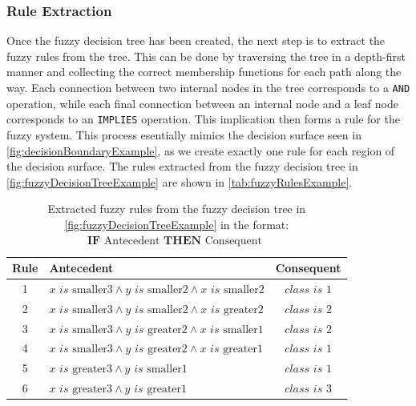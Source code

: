 \subsubsection{Rule Extraction}

Once the fuzzy decision tree has been created, the next step is to extract the fuzzy rules from the tree. This can be done by traversing the tree in a depth-first manner and collecting the correct membership functions for each path along the way. Each connection between two internal nodes in the tree corresponds to a \texttt{AND} operation, while each final connection between an internal node and a leaf node corresponds to an \texttt{IMPLIES} operation. This implication then forms a rule for the fuzzy system.
This process esentially mimics the decision surface seen in \autoref{fig:decisionBoundaryExample}, as we create exactly one rule for each region of the decision surface. The rules extracted from the fuzzy decision tree in \autoref{fig:fuzzyDecisionTreeExample} are shown in \autoref{tab:fuzzyRulesExample}.

\newcommand{\is}{\textit{ is }}


\begin{table}[H]
    \centering
    \begin{tabular}{c|l|c}
        \textbf{Rule} & \textbf{Antecedent}                                                             & \textbf{Consequent} \\
        \hline
        1             & $x \is \text{smaller3} \land y \is \text{smaller2} \land x \is \text{smaller2}$ & $class \is 1$       \\
        2             & $x \is \text{smaller3} \land y \is \text{smaller2} \land x \is \text{greater2}$ & $class \is 2$       \\
        3             & $x \is \text{smaller3} \land y \is \text{greater2} \land x \is \text{smaller1}$ & $class \is 2$       \\
        4             & $x \is \text{smaller3} \land y \is \text{greater2} \land x \is \text{greater1}$ & $class \is 1$       \\
        5             & $x \is \text{greater3} \land y \is \text{smaller1}$                             & $class \is 1$       \\
        6             & $x \is \text{greater3} \land y \is \text{greater1}$                             & $class \is 3$       \\
    \end{tabular}
    \caption[Extracted fuzzy rules from the fuzzy decision tree]{Extracted fuzzy rules from the fuzzy decision tree in \autoref{fig:fuzzyDecisionTreeExample} in the format: $\textbf{IF} \text{ Antecedent } \textbf{THEN} \text{ Consequent }$}
    \label{tab:fuzzyRulesExample}
\end{table}

